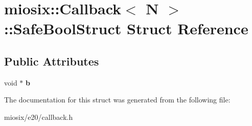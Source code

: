 \hypertarget{structmiosix_1_1_callback_1_1_safe_bool_struct}{\section{miosix\-:\-:Callback$<$ N $>$\-:\-:Safe\-Bool\-Struct Struct Reference}
\label{structmiosix_1_1_callback_1_1_safe_bool_struct}
}
\subsection*{Public Attributes}
\begin{DoxyCompactItemize}
\item 
\hypertarget{structmiosix_1_1_callback_1_1_safe_bool_struct_a9dc3ce86608968ef44410913ed210c9f}{void $\ast$ {\bfseries b}}\label{structmiosix_1_1_callback_1_1_safe_bool_struct_a9dc3ce86608968ef44410913ed210c9f}

\end{DoxyCompactItemize}


The documentation for this struct was generated from the following file\-:\begin{DoxyCompactItemize}
\item 
miosix/e20/callback.\-h\end{DoxyCompactItemize}
